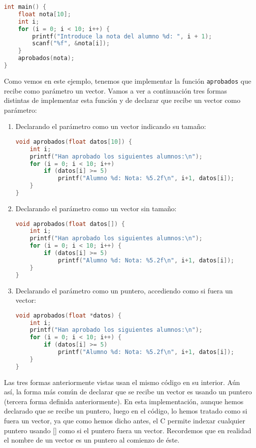 {\begin{Ejemplo}
\begin{lstlisting}[language=C]
int main() {
    float nota[10];
    int i;
    for (i = 0; i < 10; i++) {
        printf("Introduce la nota del alumno %d: ", i + 1);
        scanf("%f", &nota[i]);
    }
    aprobados(nota);
}
\end{lstlisting}
Como vemos en este ejemplo, tenemos que implementar la función \texttt{aprobados} que recibe como parámetro un vector. Vamos a ver a continuación tres formas distintas de implementar esta función y de declarar que recibe un vector como parámetro:
\begin{enumerate}
	\item Declarando el parámetro como un vector indicando su tamaño:
	\begin{lstlisting}[language=C]
void aprobados(float datos[10]) {
    int i;
    printf("Han aprobado los siguientes alumnos:\n");
    for (i = 0; i < 10; i++)
        if (datos[i] >= 5)
            printf("Alumno %d: Nota: %5.2f\n", i+1, datos[i]);
    }
}
	\end{lstlisting}
	\item Declarando el parámetro como un vector sin tamaño:
	\begin{lstlisting}[language=C]
void aprobados(float datos[]) {
    int i;
    printf("Han aprobado los siguientes alumnos:\n");
    for (i = 0; i < 10; i++) {
        if (datos[i] >= 5)
            printf("Alumno %d: Nota: %5.2f\n", i+1, datos[i]);
    }
}
	\end{lstlisting}
	\item Declarando el parámetro como un puntero, accediendo como si fuera un vector:
	\begin{lstlisting}[language=C]
void aprobados(float *datos) {
    int i;
    printf("Han aprobado los siguientes alumnos:\n");
    for (i = 0; i < 10; i++) {
        if (datos[i] >= 5)
            printf("Alumno %d: Nota: %5.2f\n", i+1, datos[i]);
    }
}
	\end{lstlisting}
\end{enumerate}
\Explicacion
Las tres formas anteriormente vistas usan el mismo código en su interior. Aún así, la forma más común de declarar que se recibe un vector es usando un puntero (tercera forma definida anteriormente). En esta implementación, aunque hemos declarado que se recibe un puntero, luego en el código, lo hemos tratado como si fuera un vector, ya que como hemos dicho antes, el C permite indexar cualquier puntero usando [] como si el puntero fuera un vector. Recordemos que en realidad el nombre de un vector es un puntero al comienzo de éste.
\end{Ejemplo}
}
